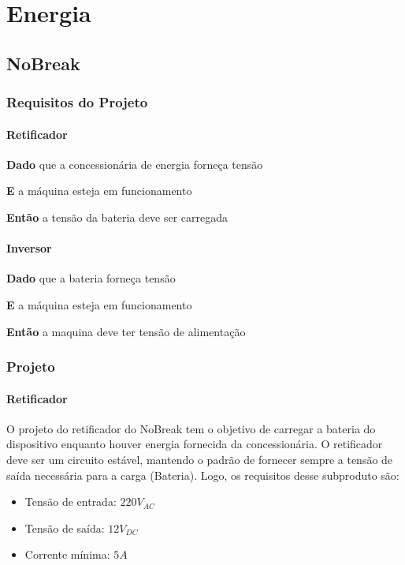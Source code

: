 \chapter[Energia]{Energia}
    \section[NoBreak]{NoBreak}
        \subsection[Requisitos do Projeto]{Requisitos do Projeto}
            \subsubsection[Retificador]{Retificador}
            	\textbf{Dado} que a concessionária de energia forneça tensão
            	
            	\textbf{E} a máquina esteja em funcionamento
            	
			    \textbf{Então} a tensão da bateria deve ser carregada 
			    
            \subsubsection[Inversor]{Inversor}
            	\textbf{Dado} que a bateria forneça tensão
            	
            	\textbf{E} a máquina esteja em funcionamento
            	
			    \textbf{Então} a maquina deve ter tensão de alimentação
			    
        \subsection[Projeto]{Projeto}     
            \subsubsection[Retificador]{Retificador}            
				O projeto do retificador do NoBreak tem o objetivo de carregar a bateria do 					dispositivo enquanto houver energia fornecida da concessionária. O retificador 				deve ser um circuito estável, mantendo o padrão de fornecer sempre a tensão de 				saída necessária para a carga (Bateria). Logo, os requisitos desse subproduto 					são:

                \begin{itemize}
                	\item Tensão de entrada: $220V_{AC}$
                	\item Tensão de saída: $12V_{DC}$
                	\item Corrente mínima: $5A$
                \end{itemize}
		
